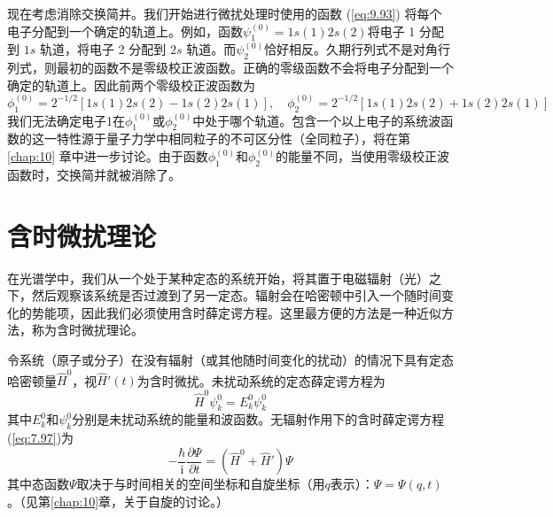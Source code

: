     现在考虑消除交换简并。我们开始进行微扰处理时使用的函数 (\ref{eq:9.93}) 将每个电子分配到一个确定的轨道上。例如，函数$\psi_1^{\left(0\right)} = 1s\left(1\right)2s\left(2\right)$将电子 1 分配到 $1s$ 轨道，将电子 2 分配到 $2s$ 轨道。而$\psi_2^{\left(0\right)}$恰好相反。久期行列式不是对角行列式，则最初的函数不是零级校正波函数。正确的零级函数不会将电子分配到一个确定的轨道上。因此前两个零级校正波函数为
    \begin{equation*}
        \phi_1^{\left(0\right)} = 2^{-1/2} \left[ 1s(1)2s(2) - 1s(2)2s(1) \right], \quad \phi_2^{\left(0\right)} = 2^{-1/2} \left[ 1s(1)2s(2) + 1s(2)2s(1) \right]
    \end{equation*}
    我们无法确定电子1在$\phi_1^{\left(0\right)}$或$\phi_2^{\left(0\right)}$中处于哪个轨道。包含一个以上电子的系统波函数的这一特性源于量子力学中相同粒子的不可区分性（全同粒子），将在第 \ref{chap:10} 章中进一步讨论。由于函数$\phi_1^{\left(0\right)}$和$\phi_2^{\left(0\right)}$的能量不同，当使用零级校正波函数时，交换简并就被消除了。

\section{含时微扰理论}
\label{sec:9.8 Time-dependent Perturbation Theory}

    在光谱学中，我们从一个处于某种定态的系统开始，将其置于电磁辐射（光）之下，然后观察该系统是否过渡到了另一定态。辐射会在哈密顿中引入一个随时间变化的势能项，因此我们必须使用含时薛定谔方程。这里最方便的方法是一种近似方法，称为含时微扰理论。

    令系统（原子或分子）在没有辐射（或其他随时间变化的扰动）的情况下具有定态哈密顿量$\hat{H}^0$，视$\hat{H}'\left(t\right)$为含时微扰。未扰动系统的定态薛定谔方程为
    \begin{equation}
        \hat{H}^0 \psi_k^0 = E_k^0 \psi_k^0
        \label{eq:9.112}
    \end{equation}
    其中$E_k^0$和$\psi_k^0$分别是未扰动系统的能量和波函数。无辐射作用下的含时薛定谔方程(\ref{eq:7.97})为
    \begin{equation}
        -\frac{\hbar}{\mathrm{i}}\frac{\partial \Psi}{\partial t} = \left(\hat{H}^0 + \hat{H}'\right) \Psi
        \label{eq:9.113}
    \end{equation}
    其中态函数$\Psi$取决于与时间相关的空间坐标和自旋坐标（用$q$表示）：$\Psi = \Psi\left(q,t\right)$。（见第\ref{chap:10}章，关于自旋的讨论。）

